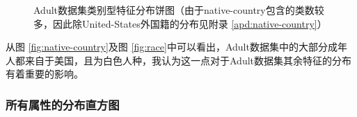 \documentclass[12pt,a4paper]{article}
\theoremstyle{definition}
\begin{document}
\begin{figure}[H]
	\centering
	\caption{Adult数据集类别型特征分布饼图（由于native-country包含的类数较多，因此除United-States外国籍的分布见附录 \ref{apd:native-country}）}
	\label{fig:class_feature_dis2}
\end{figure}

从图 \ref{fig:native-country}及图 \ref{fig:race}中可以看出，Adult数据集中的大部分成年人都来自于美国，且为白色人种，我认为这一点对于Adult数据集其余特征的分布有着重要的影响。

\subsubsection{所有属性的分布直方图}
\end{document}
